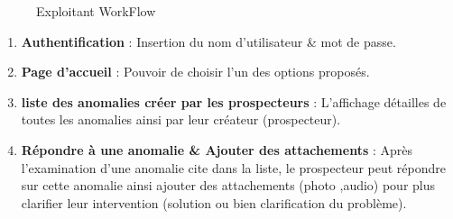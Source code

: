 \begin{figure}[H]
	\caption{\label{fig:my-label} Exploitant WorkFlow}
\end{figure}

\begin{enumerate}
\item \textbf{Authentification} : Insertion du nom d'utilisateur \& mot de passe.

\item \textbf{Page d'accueil} : Pouvoir de choisir l'un des options propos\'es.

\item \textbf{liste des anomalies cr\'eer par les prospecteurs} : L'affichage d\'etailles de toutes les anomalies ainsi par leur cr\'eateur (prospecteur).

\item \textbf{R\'epondre \`a une anomalie \& Ajouter des attachements} : Apr\`es l'examination d'une anomalie cite dans la liste, le prospecteur peut r\'epondre sur cette anomalie ainsi  ajouter des attachements (photo ,audio) pour plus clarifier leur intervention (solution ou bien clarification du probl\`eme).

\end{enumerate}

